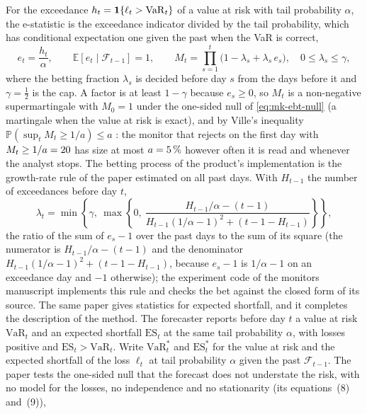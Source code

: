 For the exceedance $h_t=\mathbf{1}\{\ell_t>\mathrm{VaR}_t\}$ of a value at risk with tail probability $\alpha$, the e-statistic is the exceedance
indicator divided by the tail probability, which has conditional expectation one given the past when the VaR is correct,
\begin{equation}
e_t=\frac{h_t}{\alpha},\qquad \mathbb E\left[e_t\mid\mathcal F_{t-1}\right]=1,\qquad
M_t=\prod_{s=1}^{t}\bigl(1-\lambda_s+\lambda_s\,e_s\bigr),\quad 0\le\lambda_s\le\gamma,
\label{eq:mk-ebt}
\end{equation}
where the betting fraction $\lambda_s$ is decided before day $s$ from the days before it and $\gamma=\tfrac12$ is the cap. A factor is at least
$1-\gamma$ because $e_s\ge0$, so $M_t$ is a non-negative supermartingale with $M_0=1$ under the one-sided null of \cref{eq:mk-ebt-null} (a martingale when the value at risk is exact), and by Ville's inequality
$\mathbb P(\sup_tM_t\ge1/a)\le a$ \citep{proposed:ramdas2023}: the monitor that rejects on the first day with $M_t\ge1/a=20{}$ has
size at most $a=5{}\,\%$ however often it is read and whenever the analyst stops. The betting process of the product's implementation
is the growth-rate rule of the paper estimated on all past days. With $H_{t-1}$ the number of exceedances before day $t$,
\begin{equation}
\lambda_t=\min\!\left\{\gamma,\ \max\!\left\{0,\ \frac{H_{t-1}/\alpha-(t-1)}{H_{t-1}\left(1/\alpha-1\right)^{2}+\left(t-1-H_{t-1}\right)}\right\}\right\},
\label{eq:mk-ebt-lambda}
\end{equation}
the ratio of the sum of $e_s-1$ over the past days to the sum of its square (the numerator is $H_{t-1}/\alpha-(t-1)$ and the denominator
$H_{t-1}(1/\alpha-1)^2+(t-1-H_{t-1})$, because $e_s-1$ is $1/\alpha-1$ on an exceedance day and $-1$ otherwise); the experiment code of the
monitors manuscript implements this rule and checks the bet against the closed form of its source. The same paper gives statistics for expected
shortfall, and it completes the description of the method. The forecaster reports before day $t$ a value at risk $\mathrm{VaR}_t$ and an expected shortfall $\mathrm{ES}_t$ at the same tail probability $\alpha$, with losses positive and $\mathrm{ES}_t>\mathrm{VaR}_t$. Write $\mathrm{VaR}^{*}_t$ and $\mathrm{ES}^{*}_t$ for the value at risk and the expected shortfall of the loss $\ell_t$ at tail probability $\alpha$ given the past $\mathcal F_{t-1}$. The paper tests the one-sided null that the forecast does not understate the risk, with no model for the losses, no independence and no stationarity (its equations~(8) and~(9)),
